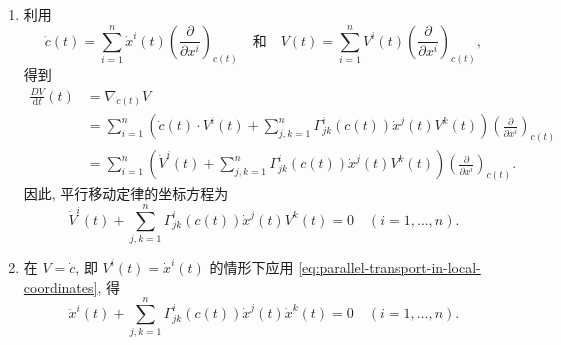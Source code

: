 \begin{description}[font=\normalfont,leftmargin=2em,labelwidth=1.5em]
\begin{enumerate}[label=(\alph*),ref=\alph*,leftmargin=*]
\item 利用
\[
  \dot c(t)=\sum_{i=1}^n\dot{x}^i(t)\left(\frac{\partial}{\partial x^i}\right)_{c(t)}
  \quad\text{和}\quad
  V(t)=\sum_{i=1}^n V^i(t)\left(\frac{\partial}{\partial x^i}\right)_{c(t)},
\]
得到
\begin{align*}
  \frac{DV}{\mathrm{d}t}(t)&=\nabla_{\dot c(t)}V\\
  &=\sum_{i=1}^n\left(\dot c(t)\cdot V^i(t)+\sum_{j,k=1}^n\Gamma^i_{jk}(c(t))\dot{x}^j(t)V^k(t)\right)
           \left(\frac{\partial}{\partial x^i}\right)_{c(t)}\\
  &=\sum_{i=1}^n\left(\dot V^i(t)+\sum_{j,k=1}^n\Gamma^i_{jk}(c(t))\dot{x}^j(t)V^k(t)\right)
           \left(\frac{\partial}{\partial x^i}\right)_{c(t)}.
\end{align*}
因此, 平行移动定律的坐标方程为
\[
  \dot V^i(t)+\sum_{j,k=1}^n\Gamma^i_{jk}(c(t))\dot{x}^j(t)V^k(t)=0
  \quad(i=1,\ldots,n).
\]
\item 在 $V=\dot c$, 即 $V^i(t)=\dot{x}^i(t)$ 的情形下应用 \eqref{eq:parallel-transport-in-local-coordinates}, 得
\[
  \ddot{x}^i(t)+\sum_{j,k=1}^n\Gamma^i_{jk}(c(t))\dot{x}^j(t)\dot{x}^k(t)=0
  \quad(i=1,\ldots,n).
\]
\end{enumerate}


\end{description}
